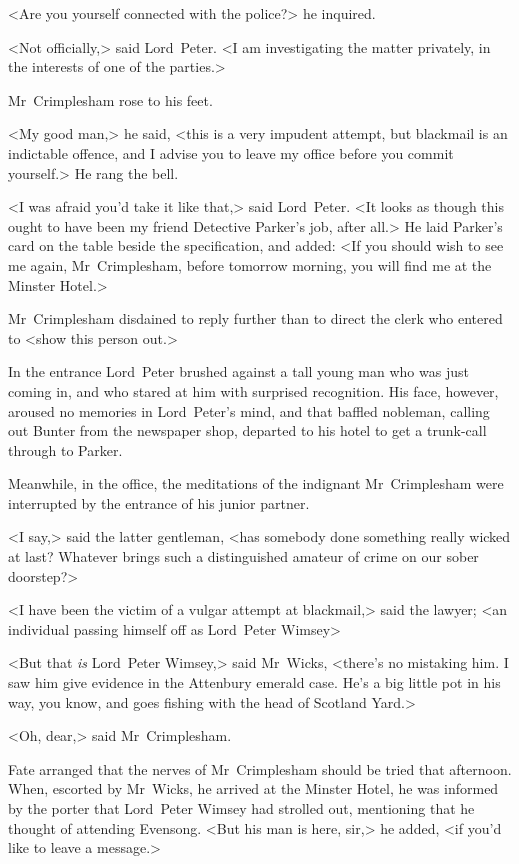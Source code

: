 <Are you yourself connected with the police?> he inquired.

<Not officially,> said Lord~Peter. <I am investigating the matter privately, in the interests of one of the parties.>

Mr~Crimplesham rose to his feet.

<My good man,> he said, <this is a very impudent attempt, but blackmail is an indictable offence, and I advise you to leave my office before you commit yourself.> He rang the bell.

<I was afraid you'd take it like that,> said Lord~Peter. <It looks as though this ought to have been my friend Detective Parker's job, after all.> He laid Parker's card on the table beside the specification, and added: <If you should wish to see me again, Mr~Crimplesham, before tomorrow morning, you will find me at the Minster Hotel.>

Mr~Crimplesham disdained to reply further than to direct the clerk who entered to <show this person out.>

In the entrance Lord~Peter brushed against a tall young man who was just coming in, and who stared at him with surprised recognition. His face, however, aroused no memories in Lord~Peter's mind, and that baffled nobleman, calling out Bunter from the newspaper shop, departed to his hotel to get a trunk-call through to Parker.

Meanwhile, in the office, the meditations of the indignant Mr~Crimplesham were interrupted by the entrance of his junior partner.

<I say,> said the latter gentleman, <has somebody done something really wicked at last? Whatever brings such a distinguished amateur of crime on our sober doorstep?>

<I have been the victim of a vulgar attempt at blackmail,> said the lawyer; <an individual passing himself off as Lord~Peter Wimsey\longdash>

<But that \textit{is} Lord~Peter Wimsey,> said Mr~Wicks, <there's no mistaking him. I saw him give evidence in the Attenbury emerald case. He's a big little pot in his way, you know, and goes fishing with the head of Scotland Yard.>

<Oh, dear,> said Mr~Crimplesham.

Fate arranged that the nerves of Mr~Crimplesham should be tried that afternoon. When, escorted by Mr~Wicks, he arrived at the Minster Hotel, he was informed by the porter that Lord~Peter Wimsey had strolled out, mentioning that he thought of attending Evensong. <But his man is here, sir,> he added, <if you'd like to leave a message.>

